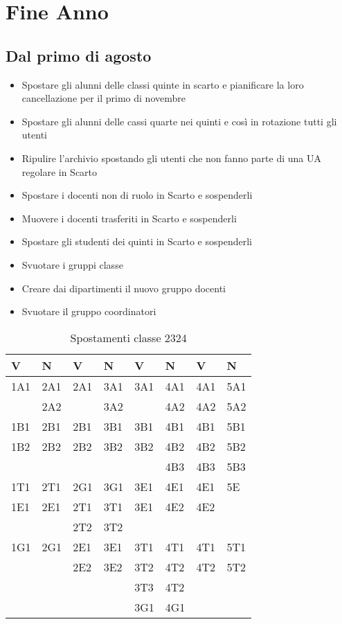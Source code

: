 \chapter{Fine Anno}
\section{Dal primo di agosto}
\begin{itemize}
	\item Spostare gli alunni delle classi quinte in scarto e pianificare la loro cancellazione per il primo di novembre
	\item Spostare gli alunni delle cassi quarte nei quinti e così in rotazione tutti gli utenti
	\item Ripulire l'archivio spostando gli utenti che non fanno parte di una UA regolare in Scarto
	\item Spostare i docenti non di ruolo in Scarto e sospenderli
	\item Muovere i docenti trasferiti in Scarto e sospenderli
	\item Spostare gli studenti dei quinti in Scarto e sospenderli
	\item Svuotare i gruppi classe
	\item Creare dai dipartimenti il nuovo gruppo docenti
	\item Svuotare il gruppo coordinatori
\end{itemize}
\begin{table}
	\centering
	\begin{tabular}{llllllll}
\toprule
V	& N & V & N & V &N  &V  &N  \\
\midrule
1A1	& 2A1 & 2A1 &3A1  & 3A1 & 4A1 & 4A1 &  5A1\\
	& 2A2 &  &3A2  &  & 4A2 & 4A2 &  5A2\\
1B1	& 2B1 & 2B1 &3B1  & 3B1 & 4B1 & 4B1 &  5B1\\
1B2	& 2B2 & 2B2 &3B2  &  3B2 & 4B2 & 4B2 &  5B2\\
	&     &     &     &     & 4B3 & 4B3 &  5B3\\
1T1	& 2T1    &  2G1   &  3G1   &  3E1   & 4E1 & 4E1 &  5E\\
1E1	& 2E1    & 2T1    & 3T1    &  3E1  & 4E2 & 4E2 &  \\
  	&        & 2T2    & 3T2    &     & &  &  \\
1G1	&   2G1     & 2E1    & 3E1    &3T1     &4T1 & 4T1 & 5T1 \\
	&        & 2E2    & 3E2    & 3T2    & 4T2& 4T2 & 5T2 \\
	&        &   &    & 3T3    & 4T2&  &  \\
	&        &   &    &  3G1    & 4G1&  &  \\	
\bottomrule
\end{tabular}
	\caption{Spostamenti classe 2324}
\end{table}